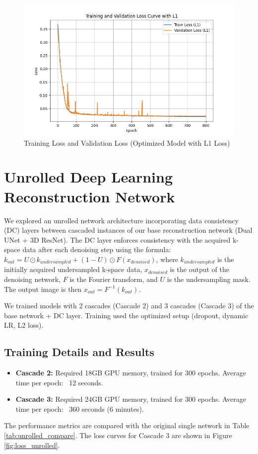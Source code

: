 \documentclass{article}
\begin{document}
\begin{figure}[ht]
  \centering
  \includegraphics[width=\linewidth]{../assets/Training Loss and Validation Loss L1.png}
  \caption{Training Loss and Validation Loss (Optimized Model with L1 Loss)}
  \label{fig:loss_l1}
\end{figure}



\section{Unrolled Deep Learning Reconstruction Network}
We explored an unrolled network architecture incorporating data consistency (DC) layers between cascaded instances of our base reconstruction network (Dual UNet + 3D ResNet). The DC layer enforces consistency with the acquired k-space data after each denoising step using the formula:
$k_{out} = U \odot k_{undersampled} + (1 - U) \odot F(x_{denoised})$, where $k_{undersampled}$ is the initially acquired undersampled k-space data, $x_{denoised}$ is the output of the denoising network, $F$ is the Fourier transform, and $U$ is the undersampling mask. The output image is then $x_{out} = F^{-1}(k_{out})$.

We trained models with 2 cascades (Cascade 2) and 3 cascades (Cascade 3) of the base network + DC layer. Training used the optimized setup (dropout, dynamic LR, L2 loss).

\subsection{Training Details and Results}
\begin{itemize}
  \item \textbf{Cascade 2:} Required 18GB GPU memory, trained for 300 epochs. Average time per epoch: ~12 seconds.
  \item \textbf{Cascade 3:} Required 24GB GPU memory, trained for 300 epochs. Average time per epoch: ~360 seconds (6 minutes).
\end{itemize}
The performance metrics are compared with the original single network in Table \ref{tab:unrolled_compare}. The loss curves for Cascade 3 are shown in Figure \ref{fig:loss_unrolled}.
\end{document}
